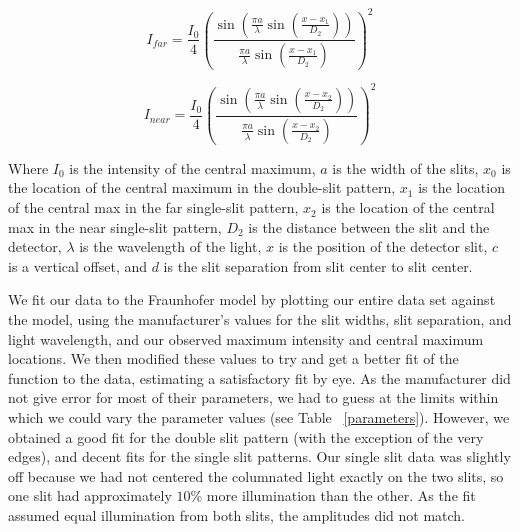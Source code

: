\documentclass[prb,preprint]{revtex4-1}
\begin{document}
\begin{equation}
I_{far}= \frac{I_{0}}{4}(\frac{\sin(\frac{\pi a}{\lambda}\sin(\frac{x-x_{1}}{D_{2}}))}{\frac{\pi a}{\lambda}\sin(\frac{x-x_{1}}{D_{2}})})^{2} 
\end{equation}

\begin{equation}
I_{near}= \frac{I_{0}}{4}(\frac{\sin(\frac{\pi a}{\lambda}\sin(\frac{x-x_{2}}{D_{2}}))}{\frac{\pi a}{\lambda}\sin(\frac{x-x_{2}}{D_{2}})})^{2} 
\end{equation}

Where $I_0$ is the intensity of the central maximum, $a$ is the width of the slits, $x_0$ is the location of the central maximum in the double-slit pattern, $x_1$ is the location of the central max in the far single-slit pattern, $x_2$ is the location of the central max in the near single-slit pattern, $D_2$ is the distance between the slit and the detector, $\lambda$ is the wavelength of the light, $x$ is the position of the detector slit, $c$ is a vertical offset, and $d$ is the slit separation from slit center to slit center. 

We fit our data to the Fraunhofer model by plotting our entire data set against the model, using the manufacturer's values for the slit widths, slit separation, and light wavelength, and our observed maximum intensity and central maximum locations.  We then modified these values to try and get a better fit of the function to the data, estimating a satisfactory fit by eye.  As the manufacturer did not give error for most of their parameters, we had to guess at the limits within which we could vary the parameter values (see Table ~\ref{parameters}). However, we obtained a good fit for the double slit pattern (with the exception of the very edges), and decent fits for the single slit patterns.  Our single slit data was slightly off because we had not centered the columnated light exactly on the two slits, so one slit had approximately $10\%$ more illumination than the other.  As the fit assumed equal illumination from both slits, the amplitudes did not match.  
\end{document}
